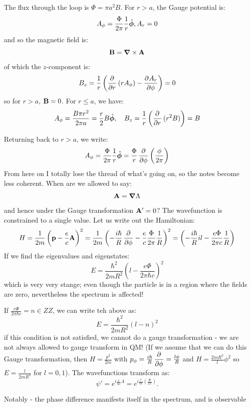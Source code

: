 The flux through the loop is $\Phi = \pi a^2 B$. For $r > a$, the Gauge potential is:
\begin{equation}
    A_\phi = \frac{\Phi}{2\pi}\frac{1}{r}\phihat, A_r = 0
\end{equation}
and so the magnetic field is:
\begin{equation}
    \v{B} = \nabla \times \v{A}
\end{equation}
of which the $z$-component is:
\begin{equation}
    B_z = \frac{1}{r}\left(\dpd{}{r}(rA_\phi) - \dpd{A_r}{\phi}\right) = 0
\end{equation}
so for $r > a$, $\mathbf{B} = 0$. For $r \leq a$, we have:
\begin{equation}
    A_\phi = \frac{B\pi r^2}{2\pi a} = \frac{r}{2}B\phihat, \quad B_z = \frac{1}{r}\left(\dpd{}{r}(r^2 B)\right) = B
\end{equation} 

Returning back to $r > a$, we write:
\begin{equation}
    A_\phi = \frac{\Phi}{2\pi}\frac{1}{r}\phihat = \frac{\Phi}{r}\dpd{}{\phi}\left(\frac{\phi}{2\pi}\right)
\end{equation}
From here on I totally lose the thread of what's going on, so the notes become less coherent. When are we allowed to say:
\begin{equation}
    \v{A} = \nabla \Lambda
\end{equation}
and hence under the Gauge transformation $\mathbf{A}' = 0$? The wavefunction is constrained to a single value. Let us write out the Hamiltonian:
\begin{equation}
    H = \frac{1}{2m}\left(\v{p} - \frac{e}{c}\v{A}\right)^2 = \frac{1}{2m}\left(-\frac{i\hbar}{R}\dpd{}{\phi} - \frac{e}{c}\frac{\Phi}{2\pi}\frac{1}{R}\right)^2 = \left(-\frac{i\hbar}{R}il - \frac{e\Phi}{2\pi c}\frac{1}{R}\right)
\end{equation}
If we find the eigenvalues and eigenstates:
\begin{equation}
    E = \frac{\hbar^2}{2mR^2}\left(l - \frac{e\Phi}{2\pi\hbar c}\right)^2
\end{equation}
which is very very stange; even though the particle is in a region where the fields are zero, nevertheless the spectrum is affected!

If $\frac{e\Phi}{2\pi \hbar c} = n \in ZZ$, we can write teh above as:
\begin{equation}
    E = \frac{\hbar^2}{2mR^2}(l - n)^2
\end{equation}
if this condition is not satisfied, we cannot do a gauge transformation - we are not always allowed to gauge transform in QM! (If we assume that we can do this Gauge transformation, then $H = \frac{p^2}{2m}$ with $p_\phi = \frac{i\hbar}{R}\dpd{}{\phi} = \frac{l\phi}{R}$ and $H = \frac{2mR^2}l\phi^2$ so $E = \frac{l}{2mR^2}$ for $l = 0, 1$). The wavefunctions transform as:
\begin{equation}
    \psi' = e^{i\frac{e}{\hbar c}\Lambda} = e^{i\frac{e}{\hbar c}\left(\frac{\Phi}{2\pi}\right)}.
\end{equation}  

Notably - the phase difference manifests itself in the spectrum, and is observable

